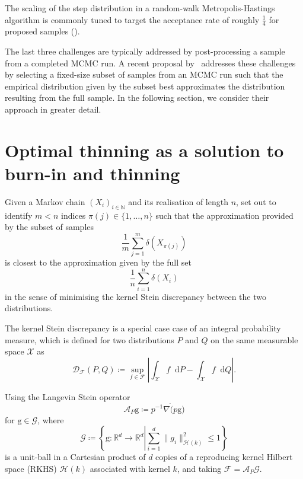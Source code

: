 \documentclass[12pt,a4paper]{report}
\newcommand*\diff{\mathop{}\!\mathrm{d}}
\begin{document}
The scaling of the step distribution in a random-walk Metropolis-Hastings algorithm is commonly tuned to target the acceptance rate of roughly $\frac{1}{4}$ for proposed samples (\cite{gelman_efficient_1996,gelman_weak_1997,roberts_optimal_2001}).

The last three challenges are typically addressed by post-processing a sample from a completed MCMC run. A recent proposal by~\cite{riabiz_optimal_2022} addresses these challenges by selecting a fixed-size subset of samples from an MCMC run such that the empirical distribution given by the subset best approximates the distribution resulting from the full sample. In the following section, we consider their approach in greater detail.


\section{Optimal thinning as a solution to burn-in and thinning}

Given a Markov chain $(X_i)_{i \in \mathbb{N}}$ and its realisation of length $n$, \cite{riabiz_optimal_2022} set out to identify $m < n$ indices $\pi(j) \in \{1,\dots, n\}$ such that the approximation provided by the subset of samples
$$\frac{1}{m} \sum_{j=1}^m \delta(X_{\pi(j)})$$
is closest to the approximation given by the full set
$$\frac{1}{n} \sum_{i=1}^n \delta(X_i)$$
in the sense of minimising the kernel Stein discrepancy between the two distributions.

The kernel Stein discrepancy is a special case case of an integral probability measure, which is defined for two distributions $P$ and $Q$ on the same measurable space $\mathcal{X}$ as
$$\mathcal{D}_{\mathcal{F}}(P, Q) \coloneq \sup_{f \in \mathcal{F}}\left|\int_\mathcal{X} f \diff P - \int_\mathcal{X} f \diff Q \right|.$$

Using the Langevin Stein operator 
$$\mathcal{A}_P \mathrm{g} \coloneq p^{-1} \nabla \dot (p \mathrm{g})$$
for $\mathrm{g} \in \mathcal{G}$, where
$$\mathcal{G} \coloneq \left\{ \mathrm{g} : \mathbb{R}^d \to \mathbb{R}^d \left| \sum_{i=1}^d \|g_i\|^2_{\mathcal{H}(k)} \leq 1 \right.\right\}$$
is a unit-ball in a Cartesian product of $d$ copies of a reproducing kernel Hilbert space (RKHS) $\mathcal{H}(k)$ associated with kernel $k$, and taking $\mathcal{F} = \mathcal{A}_P \mathcal{G}$.

\end{document}
